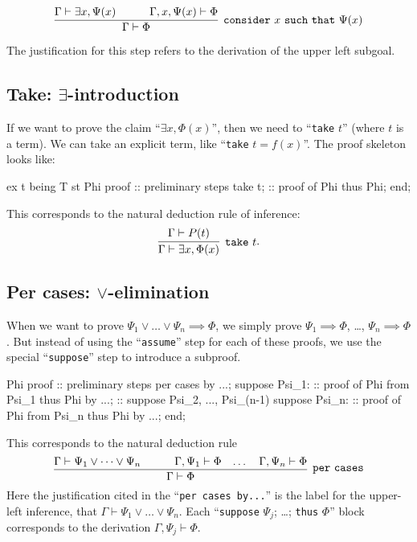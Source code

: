 \begin{equation}
\vcenter{\infer[\mathtt{consider}~x~\mathtt{such~that}~\Psi(x)]{\Gamma\vdash\Phi}{%
  \Gamma\vdash\exists x,\Psi(x)
  &\qquad\Gamma,x,\Psi(x)\vdash\Phi}}
\end{equation}{
The justification for this step refers to the derivation of the upper
left subgoal.

\subsection{Take: $\exists$-introduction}
If we want to prove the claim ``$\exists x,\Phi(x)$'', then we need to
``\verb#take# $t$'' (where $t$ is a term). We can take an explicit term,
like ``\verb#take# $t = f(x)$''. The proof skeleton looks like:
\begin{mizar}
ex t being T st Phi
proof
  :: preliminary steps
  take t;
  :: proof of Phi
  thus Phi;
end;
\end{mizar}%
This corresponds to the natural deduction rule of inference:
\begin{equation}
  \vcenter{\infer[\mathtt{take}~t]{\Gamma\vdash\exists x,\Phi(x)}{\Gamma\vdash P(t)}}.
\end{equation}

\subsection{Per cases: $\lor$-elimination}
When we want to prove $\Psi_{1}\lor\dots\lor\Psi_{n}\implies \Phi$,
we simply prove $\Psi_{1}\implies\Phi$, \dots, $\Psi_{n}\implies\Phi$.
But instead of using the ``\verb#assume#'' step for each of these
proofs, we use the special ``\verb#suppose#'' step to introduce a
subproof.
\begin{mizar}
Phi
proof
  :: preliminary steps
  per cases by ...;
  suppose Psi_1:
    :: proof of Phi from Psi_1
    thus Phi by ...;
  :: suppose Psi_2, ..., Psi_(n-1)
  suppose Psi_n:
    :: proof of Phi from Psi_n
    thus Phi by ...;
end;
\end{mizar}%
This corresponds to the natural deduction rule
\begin{equation}
  \vcenter{\infer[\mathtt{per~cases}]{\Gamma\vdash \Phi}{%
    \Gamma\vdash\Psi_{1}\lor\dots\lor\Psi_{n}
    & \qquad\Gamma,\Psi_{1}\vdash\Phi
    & \dots
    & \Gamma,\Psi_{n}\vdash\Phi}}
\end{equation}
Here the justification cited in the ``\verb#per cases by...#'' is the
label for the upper-left inference, that $\Gamma\vdash\Psi_{1}\lor\dots\lor\Psi_{n}$.
Each ``\verb#suppose# $\Psi_{j}$; \dots; \verb#thus# $\Phi$'' block
corresponds to the derivation $\Gamma,\Psi_{j}\vdash\Phi$.

}

